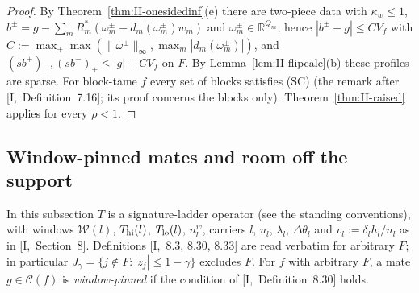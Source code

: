 \documentclass[10pt]{amsart}
\theoremstyle{definition}
\theoremstyle{remark}
\newcommand{\R}{\mathbb R}
\newcommand{\Cset}{\mathcal C}
\begin{document}
\begin{proof}
By Theorem~\ref{thm:II-onesidedinf}(e) there are two-piece data with
$\kappa_w\le1$, $b^\pm=g-\sum_mR_m^*(\omega^\pm_m-d_m(\omega^\pm_m)w_m)$ and
$\omega^\pm_m\in\R^{Q_m}$; hence $|b^\pm-g|\le CV_f$ with
$C:=\max_\pm\max(\|\omega^\pm\|_\infty,\max_m|d_m(\omega^\pm_m)|)$, and
$(sb^+)_-,(sb^-)_+\le|g|+CV_f$ on $F$.  By Lemma~\ref{lem:II-flipcalc}(b) these
profiles are sparse.  For block-tame $f$ every set of blocks satisfies
(SC) (the remark after [I,~Definition~7.16]; its proof concerns the
blocks only).  Theorem~\ref{thm:II-raised} applies for every $\rho<1$.
\end{proof}

\subsection{Window-pinned mates and room off the support}\label{subsec:II-room}

In this subsection $T$ is a signature-ladder operator (see the standing
conventions), with windows $\mathcal W(l)$, $T_{\rm hi}(l)$, $T_{\rm lo}(l)$,
$n^w_l$, carriers $l$, $u_l$, $\lambda_l$, $\Delta\theta_l$ and
$v_l:=\delta_lh_l/n_l$ as in [I,~Section~8].  Definitions [I,~8.3, 8.30,
8.33] are read verbatim for arbitrary $F$; in particular $J_\gamma=\{j\notin
F:|z_j|\le1-\gamma\}$ excludes $F$.  For $f$ with arbitrary $F$, a mate
$g\in\Cset(f)$ is \emph{window-pinned} if the condition of
[I,~Definition~8.30] holds.
\end{document}
